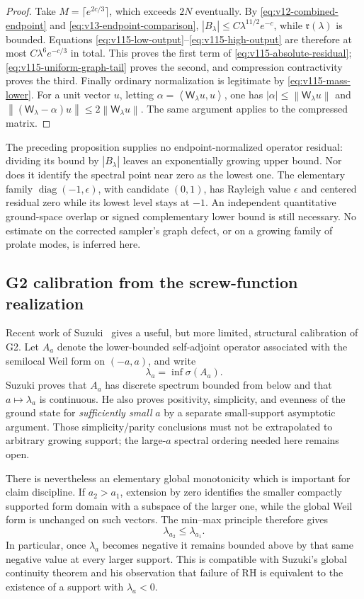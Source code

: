 \documentclass[11pt]{article}
\theoremstyle{remark}
\newcommand{\norm}[1]{\left\lVert #1\right\rVert}
\newcommand{\ip}[2]{\left\langle #1,#2\right\rangle}
\begin{document}
\begin{proof}
Take $M=\lceil e^{2c/3}\rceil$, which exceeds $2N$ eventually.
By \eqref{eq:v12-combined-endpoint} and
\eqref{eq:v13-endpoint-comparison},
$|B_\lambda|\le C\lambda^{11/2}e^{-c}$, while
$\mathfrak r(\lambda)$ is bounded. Equations
\eqref{eq:v115-low-output}--\eqref{eq:v115-high-output} are therefore
at most $C\lambda^6e^{-c/3}$ in total. This proves the first term of
\eqref{eq:v115-absolute-residual};
\eqref{eq:v115-uniform-graph-tail} proves the second, and compression
contractivity proves the third.
Finally ordinary normalization is legitimate by
\eqref{eq:v115-mass-lower}. For a unit vector $u$, letting
$\alpha=\ip{\mathsf W_\lambda u}u$, one has
$|\alpha|\le\norm{\mathsf W_\lambda u}$ and
$\norm{(\mathsf W_\lambda-\alpha)u}\le2\norm{\mathsf W_\lambda u}$.
The same argument applies to the compressed matrix.
\end{proof}

The preceding proposition supplies no endpoint-normalized operator residual:
dividing its bound by $|B_\lambda|$ leaves an exponentially growing
upper bound. Nor does it identify the spectral point near zero as the
lowest one. The elementary family $\operatorname{diag}(-1,\epsilon)$,
with candidate $(0,1)$, has Rayleigh value $\epsilon$ and centered
residual zero while its lowest level stays at $-1$. An independent
quantitative ground-space overlap or signed complementary lower bound
is still necessary. No estimate on the corrected sampler's graph defect,
or on a growing family of prolate modes, is inferred here.

\subsection*{G2 calibration from the screw-function realization}
Recent work of Suzuki~\cite{Suzuki2026} gives a useful, but more limited, structural calibration of G2.  Let $A_a$ denote the lower-bounded self-adjoint operator associated with the semilocal Weil form on $(-a,a)$, and write
\[
 \lambda_a=\inf\sigma(A_a).
\]
Suzuki proves that $A_a$ has discrete spectrum bounded from below and that $a\mapsto\lambda_a$ is continuous.  He also proves positivity, simplicity, and evenness of the ground state for \emph{sufficiently small} $a$ by a separate small-support asymptotic argument.  Those simplicity/parity conclusions must not be extrapolated to arbitrary growing support; the large-$a$ spectral ordering needed here remains open.

There is nevertheless an elementary global monotonicity which is important for claim discipline.  If $a_2>a_1$, extension by zero identifies the smaller compactly supported form domain with a subspace of the larger one, while the global Weil form is unchanged on such vectors.  The min--max principle therefore gives
\begin{equation*}
 \boxed{\lambda_{a_2}\le \lambda_{a_1}.}
 \tag{G2.1}\label{eq:g2-monotone}
\end{equation*}
In particular, once $\lambda_a$ becomes negative it remains bounded above by that same negative value at every larger support.  This is compatible with Suzuki's global continuity theorem and his observation that failure of RH is equivalent to the existence of a support with $\lambda_a<0$.
\end{document}
